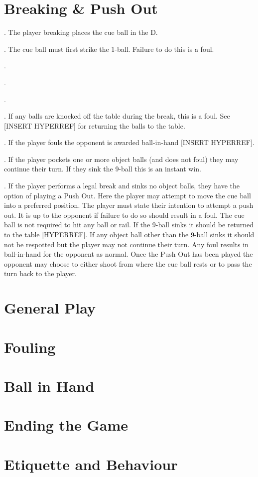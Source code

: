 \section{Breaking \& Push Out} \label{9ball:breaking}
\ex. The player breaking places the cue ball in the D.\par
\ex. The cue ball must first strike the 1-ball. Failure to do this is a foul.\par
\ex. \CueBallMissOffBreak[9ball]\par
\ex. \CueBallRailOffBreak\par
\ex. \CueBallSinkOffBreak\par
\ex. If any balls are knocked off the table during the break, this is a foul. See [INSERT HYPERREF] for returning the balls to the table.\par
\ex. If the player fouls the opponent is awarded ball-in-hand [INSERT HYPERREF].\par
\ex. If the player pockets one or more object balls (and does not foul) they may continue their turn. If they sink the 9-ball this is an instant win.\par
\ex. \label{9ball:pushout}If the player performs a legal break and sinks no object balls, they have the option of playing a Push Out.\itemspace 
{}Here the player may attempt to move the cue ball into a preferred position.\itemspace
{}The player must state their intention to attempt a push out. It is up to the opponent if failure to do so should result in a foul.\itemspace
{}The cue ball is not required to hit any ball or rail.\itemspace
{}If the 9-ball sinks it should be returned to the table [HYPERREF].\itemspace
{}If any object ball other than the 9-ball sinks it should not be respotted but the player may not continue their turn.\itemspace
{}Any foul results in ball-in-hand for the opponent as normal.\itemspace
{}Once the Push Out has been played the opponent may choose to either shoot from where the cue ball rests or to pass the turn back to the player.
\par

\section{General Play} \label{9ball:general}

\section{Fouling} \label{9ball:fouling}

\section{Ball in Hand} \label{9ball:ballinhand}

\section{Ending the Game} \label{9ball:ending}

\section{Etiquette and Behaviour} \label{9ball:etiquette}









